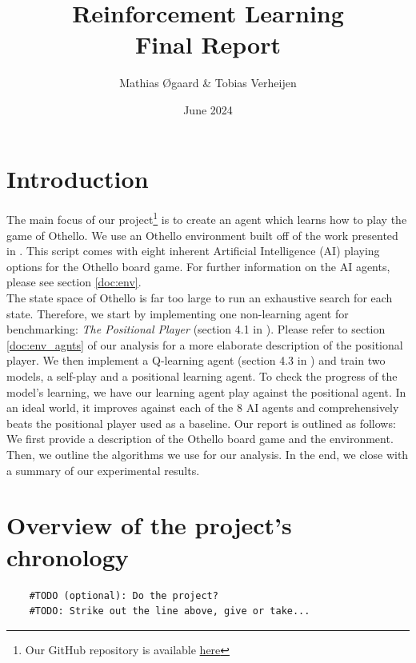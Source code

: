 \documentclass{article}
\title{Reinforcement Learning\\ \large{Final Report}}
\author{Mathias Øgaard \& Tobias Verheijen}
\date{June 2024}
\begin{document}
\maketitle

\tableofcontents

\section{Introduction}
The main focus of our project\footnote{Our GitHub repository is available \href{https://github.com/Ma10as00/othello_agent}{here}} is to create an agent which learns how to play the game of Othello. We use an Othello environment built off of the work presented in \cite{codes}. This script comes with eight inherent Artificial Intelligence (AI) playing options for the Othello board game. For further information on the AI agents, please see section \ref{doc:env}.\\
The state space of Othello is far too large to run an exhaustive search for each state. Therefore, we start by implementing one non-learning agent for benchmarking: \textit{The Positional Player} (section 4.1 in \cite{vanEck2008}). Please refer to section \ref{doc:env_agnts} of our analysis for a more elaborate description of the positional player. We then implement a Q-learning agent (section 4.3 in \cite{vanEck2008}) and train two models, a self-play and a positional learning agent.
To check the progress of the model's learning, we have our learning agent play against the positional agent. In an ideal world, it improves against each of the 8 AI agents and comprehensively beats the positional player used as a baseline. Our report is outlined as follows: We first provide a description of the Othello board game and the environment.
Then, we outline the algorithms we use for our analysis. In the end, we close with a summary of our experimental results.

\section{Overview of the project's chronology}
\begin{verbatim}
    #TODO (optional): Do the project?
    #TODO: Strike out the line above, give or take...
\end{verbatim}
\end{document}
